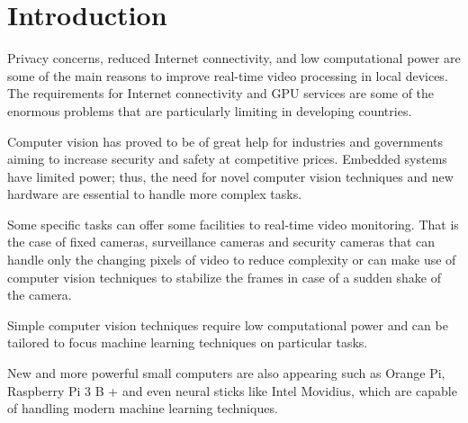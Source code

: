 \documentclass[fleqn,12pt]{SelfArx} %
\affiliation{\textsuperscript{1}\textit{Chief Technology Officer, DeMS, Smart Cities}} %
\affiliation{\textsuperscript{2}\textit{Chief Executive Officer, DeMS, Smart Cities}} %
\affiliation{*\textbf{Stanley Salvatierra}: s.salvatierra@deepmicrosystems.com} %
\begin{document}
\flushbottom %

\maketitle %

\tableofcontents %

\thispagestyle{empty} %


\section*{Introduction} %


Privacy concerns, reduced Internet connectivity, and low computational power are some of the main reasons to improve real-time video processing in local devices. The requirements for Internet connectivity and GPU services are some of the enormous problems that are particularly limiting in developing countries.

Computer vision has proved to be of great help for industries and governments aiming to increase security and safety at competitive prices. Embedded systems have limited power; thus, the need for novel computer vision techniques and new hardware are essential to handle more complex tasks.

Some specific tasks can offer some facilities to real-time video monitoring. That is the case of fixed cameras, surveillance cameras and security cameras that can handle only the changing pixels of video to reduce complexity or can make use of computer vision techniques to stabilize the frames in case of a sudden shake of the camera.

Simple computer vision techniques require low computational power and can be tailored to focus machine learning techniques on particular tasks.

New and more powerful small computers are also appearing such as Orange Pi, Raspberry Pi 3 B + and even neural sticks like Intel Movidius, which are capable of handling modern machine learning techniques.
\end{document}
